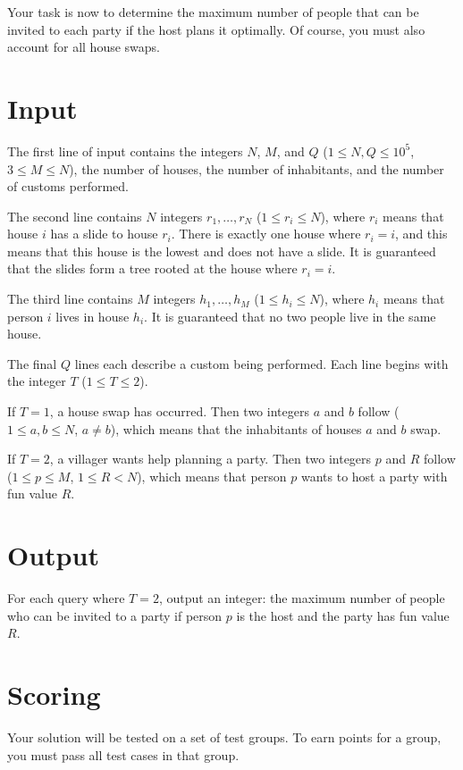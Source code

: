 Your task is now to determine the maximum number of people that can be invited to each party if the host plans it optimally.
Of course, you must also account for all house swaps.

\section*{Input}
The first line of input contains the integers $N$, $M$, and $Q$ ($1 \leq N, Q \leq 10^5$, $3 \leq M \leq N$),
the number of houses, the number of inhabitants, and the number of customs performed.

The second line contains $N$ integers $r_1, \dots, r_N$ ($1 \leq r_i \leq N$),
where $r_i$ means that house $i$ has a slide to house $r_i$.
There is exactly one house where $r_i = i$, and this means that this house is the lowest and does not have a slide.
It is guaranteed that the slides form a tree rooted at the house where $r_i = i$.

The third line contains $M$ integers $h_1, \dots, h_M$ ($1 \leq h_i \leq N$),
where $h_i$ means that person $i$ lives in house $h_i$.
It is guaranteed that no two people live in the same house.

The final $Q$ lines each describe a custom being performed. Each line begins with the integer $T$ ($1 \leq T \leq 2$).

If $T=1$, a house swap has occurred. Then two integers $a$ and $b$ follow ($1 \leq a, b \leq N$, $a \neq b$),
which means that the inhabitants of houses $a$ and $b$ swap.

If $T=2$, a villager wants help planning a party. Then two integers $p$ and $R$ follow ($1 \leq p \leq M$, $1 \leq R < N$),
which means that person $p$ wants to host a party with fun value $R$.

\section*{Output}
For each query where $T=2$, output an integer: the maximum number of people who can be invited to a party
if person $p$ is the host and the party has fun value $R$.

\section*{Scoring}
Your solution will be tested on a set of test groups.
To earn points for a group, you must pass all test cases in that group.


